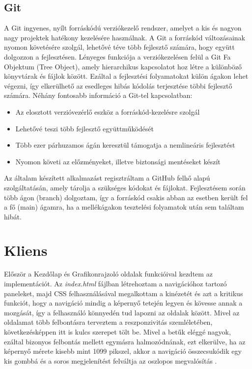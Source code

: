 \subsection{Git }

A Git ingyenes, nyílt forráskódú verziókezelő rendszer, amelyet a kis és nagyon nagy projektek hatékony kezelésére használnak. A Git a forráskód változásainak nyomon követésére szolgál, lehetővé téve több fejlesztő számára, hogy együtt dolgozzon a fejlesztésen. Lényeges funkciója a verziókezelésen felül a Git Fa Objektum (Tree Object), amely hierarchikus kapcsolatot hoz létre a különböző könyvtárak és fájlok között. Ezáltal a fejlesztési folyamatokat külön ágakon lehet végezni, így elkerülhető az esedleges hibás kódolás terjesztése többi fejlesztő számára. Néhány fontosabb információ a Git-tel kapcsolatban: 

\begin{itemize}
\item Az elosztott verzióvezérlő eszköz a forráskód-kezelésre szolgál
\item Lehetővé teszi több fejlesztő együttműködését
\item Több ezer párhuzamos ágán keresztül támogatja a nemlineáris fejlesztést
\item Nyomon követi az előzményeket, illetve biztonsági mentéseket készít \cite{git}
\end{itemize}

Az általam készített alkalmazást regisztráltam a GitHub felhő alapú szolgáltatásán, amely tárolja a szükséges kódokat és fájlokat. Fejlesztésem során több ágon (branch) dolgoztam, így a forráskód csakis abban az esetben került fel a fő (main) ágamra, ha a mellékágakon tesztelési folyamatok után sem találtam hibát.

\section{Kliens}

Először a Kezdőlap és Grafikonrajzoló oldalak funkcióival kezdtem az implementációt. Az \emph{index.html} fájlban létrehoztam a navigációhoz tartozó paneleket, majd CSS felhasználásával megalkottam a kinézetét és azt a kritikus funkciót, hogy a navigáció mindig a képernyő tetején legyen és kövesse annak a mozgását, így a felhasználó könnyedén tud lapozni az oldalak között. Mivel az oldalamat több felbontásra terveztem a reszponzivitás szemléletében, következésképpen itt is kulcs szerepet tölt be. Mivel a betűk eléggé nagyok, ezáltal bizonyos felbontás mellett egymásra halmozódnának, ezt elkerülve, ha az képernyő mérete kisebb mint 1099 pikszel, akkor a navigáció összecsukódik egy kis gombbá és a soros megjelenítést felváltja az oszlopos megvalósítás .

